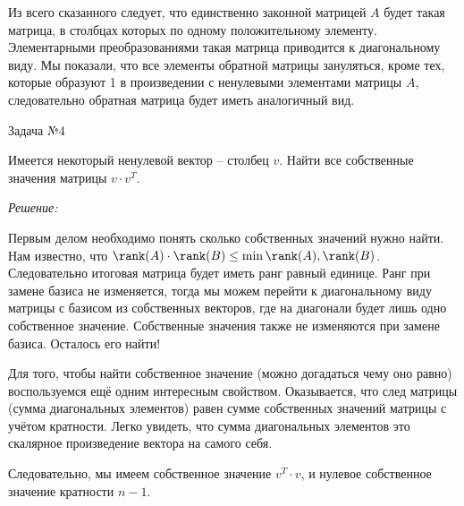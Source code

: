 \documentclass[10pt]{article}
\begin{document}
Из всего сказанного следует, что единственно законной матрицей $A$ будет такая матрица, в столбцах которых по одному положительному элементу. Элементарными преобразованиями такая матрица приводится к диагональному виду. Мы показали, что все элементы обратной матрицы зануляться, кроме тех, которые образуют 1 в произведении с ненулевыми элементами матрицы $A$, следовательно обратная матрица будет иметь аналогичный вид. 

\hspace{2mm}

Задача №4

Имеется некоторый ненулевой вектор -- столбец $v$. Найти все собственные значения матрицы $v\cdot v^T$.

\textit{Решение:}

Первым делом необходимо понять сколько собственных значений нужно найти. Нам известно, что $\rank(A) \cdot \rank(B) \leq \min {\rank(A), \rank(B)}$. Следовательно итоговая матрица будет иметь ранг равный единице. Ранг при замене базиса не изменяется, тогда мы можем перейти к диагональному виду матрицы с базисом из собственных векторов, где на диагонали будет лишь одно собственное значение. Собственные значения также не изменяются при замене базиса. Осталось его найти! 

Для того, чтобы найти собственное значение (можно догадаться чему оно равно) воспользуемся ещё одним интересным свойством. Оказывается, что след матрицы (сумма диагональных элементов) равен сумме собственных значений матрицы с учётом кратности. Легко увидеть, что сумма диагональных элементов это скалярное произведение вектора на самого себя.

Следовательно, мы имеем собственное значение $v^T\cdot v$, и нулевое собственное значение кратности $n - 1$.
\end{document}
